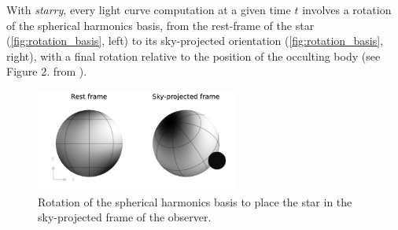 \documentclass[modern]{aastex631}
\begin{document}
With \textit{starry}, every light curve computation at a given time $t$ involves a rotation of the spherical harmonics basis, from the rest-frame of the star (\autoref{fig:rotation_basis}, left) to its sky-projected orientation (\autoref{fig:rotation_basis}, right), with a final rotation relative to the position of the occulting body (see Figure 2. from \citealt{starry}).
\begin{figure}[H]
    \begin{center}
        \includegraphics[width=0.6\textwidth]{../workflows/rotations/figures/rotation_basis.pdf}
        \caption{Rotation of the spherical harmonics basis to place the star in the sky-projected frame of the observer.}
        \label{fig:rotation_basis}
    \end{center}
\end{figure}
\end{document}
